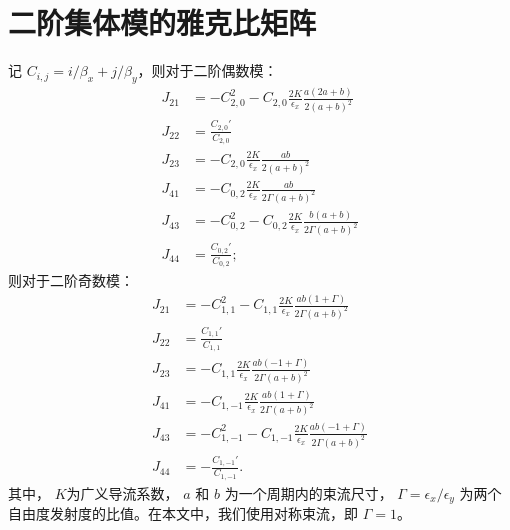 
\chapter{二阶集体模的雅克比矩阵}

\label{appdendix:Jacobi}
记 $C_{i,j}=i/\beta_x+j/\beta_y$，则对于二阶偶数模：
\begin{equation}\label{eq:Jacobi_even}
\begin{split}
J_{21} &= - C_{2,0}^2 - C_{2,0} \frac{2 K}{\epsilon_x} \frac{a (2a+b) }{2  (a+b)^2}   \\
J_{22} &= \frac{C_{2,0}'}{C_{2,0}}   \\
J_{23} &= - C_{2,0} \frac{2 K}{\epsilon_x} \frac{a b }{2 (a+b)^2}  \\
J_{41} &= - C_{0,2} \frac{2 K}{\epsilon_x} \frac{a b }{2 \Gamma (a+b)^2}   \\
J_{43} &= - C_{0,2}^2 - C_{0,2} \frac{2 K}{\epsilon_x} \frac{ b(a+b) }{2 \Gamma (a+b)^2} \\
J_{44} &= \frac{C_{0,2}'}{C_{0,2}};
\end{split}
\end{equation}
则对于二阶奇数模：
\begin{equation}\label{eq:Jacobi_odd}
\begin{split}
J_{21} &= - C_{1,1}^2 - C_{1,1} \frac{2 K}{\epsilon_x} \frac{a b (1+\Gamma)}{2 \Gamma (a+b)^2}   \\
J_{22} &= \frac{C_{1,1}'}{C_{1,1}} \\
J_{23} &= - C_{1,1} \frac{2 K}{\epsilon_x} \frac{a b (-1+\Gamma)}{2 \Gamma (a+b)^2}  \\
J_{41} &= - C_{1,-1} \frac{2 K}{\epsilon_x} \frac{a b (1+\Gamma)}{2 \Gamma (a+b)^2}  \\
J_{43} &= - C_{1,-1}^2 - C_{1,-1} \frac{2 K}{\epsilon_x} \frac{a b (-1+\Gamma)}{2 \Gamma (a+b)^2} \\
J_{44} &= -\frac{C_{1,-1}'}{C_{1,-1}}.
\end{split}
\end{equation}
其中， $K$为广义导流系数， $a$ 和 $b$ 为一个周期内的束流尺寸，  $\Gamma=\epsilon_x/\epsilon_y$ 为两个自由度发射度的比值。在本文中，我们使用对称束流，即 $\Gamma=1$。


